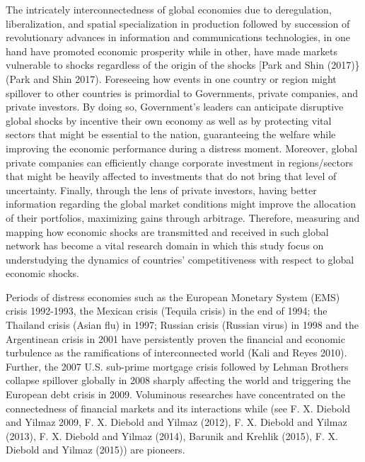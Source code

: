 \documentclass[]{elsarticle} %
\begin{document}
The intricately interconnectedness of global economies due to
deregulation, liberalization, and spatial specialization in production
followed by succession of revolutionary advances in information and
communications technologies, in one hand have promoted economic
prosperity while in other, have made markets vulnerable to shocks
regardless of the origin of the shocks {[}Park and Shin (2017)\} (Park
and Shin 2017). Foreseeing how events in one country or region might
spillover to other countries is primordial to Governments, private
companies, and private investors. By doing so, Government's leaders can
anticipate disruptive global shocks by incentive their own economy as
well as by protecting vital sectors that might be essential to the
nation, guaranteeing the welfare while improving the economic
performance during a distress moment. Moreover, global private companies
can efficiently change corporate investment in regions/sectors that
might be heavily affected to investments that do not bring that level of
uncertainty. Finally, through the lens of private investors, having
better information regarding the global market conditions might improve
the allocation of their portfolios, maximizing gains through arbitrage.
Therefore, measuring and mapping how economic shocks are transmitted and
received in such global network has become a vital research domain in
which this study focus on understudying the dynamics of countries'
competitiveness with respect to global economic shocks.

Periods of distress economies such as the European Monetary System (EMS)
crisis 1992-1993, the Mexican crisis (Tequila crisis) in the end of
1994; the Thailand crisis (Asian flu) in 1997; Russian crisis (Russian
virus) in 1998 and the Argentinean crisis in 2001 have persistently
proven the financial and economic turbulence as the ramifications of
interconnected world (Kali and Reyes 2010). Further, the 2007 U.S.
sub-prime mortgage crisis followed by Lehman Brothers collapse spillover
globally in 2008 sharply affecting the world and triggering the European
debt crisis in 2009. Voluminous researches have concentrated on the
connectedness of financial markets and its interactions while (see F. X.
Diebold and Yilmaz 2009, F. X. Diebold and Yilmaz (2012), F. X. Diebold
and Yilmaz (2013), F. X. Diebold and Yilmaz (2014), Barunik and Krehlik
(2015), F. X. Diebold and Yilmaz (2015)) are pioneers.
\end{document}
